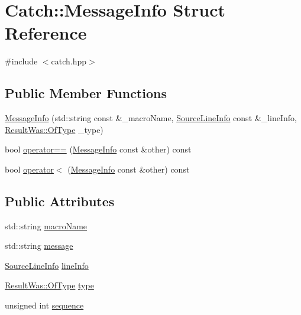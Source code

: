 \hypertarget{structCatch_1_1MessageInfo}{}\section{Catch\+:\+:Message\+Info Struct Reference}
\label{structCatch_1_1MessageInfo}


{\ttfamily \#include $<$catch.\+hpp$>$}

\subsection*{Public Member Functions}
\begin{DoxyCompactItemize}
\item 
\mbox{\hyperlink{structCatch_1_1MessageInfo_a2e336c33ebef7af3c1bbae6a56e14f8a}{Message\+Info}} (std\+::string const \&\+\_\+macro\+Name, \mbox{\hyperlink{structCatch_1_1SourceLineInfo}{Source\+Line\+Info}} const \&\+\_\+line\+Info, \mbox{\hyperlink{structCatch_1_1ResultWas_a624e1ee3661fcf6094ceef1f654601ef}{Result\+Was\+::\+Of\+Type}} \+\_\+type)
\item 
bool \mbox{\hyperlink{structCatch_1_1MessageInfo_af4b37f2172ba55395813b4bb6bbbde1a}{operator==}} (\mbox{\hyperlink{structCatch_1_1MessageInfo}{Message\+Info}} const \&other) const
\item 
bool \mbox{\hyperlink{structCatch_1_1MessageInfo_a8254cb8fca2da02a29a9843cdcb79df1}{operator$<$}} (\mbox{\hyperlink{structCatch_1_1MessageInfo}{Message\+Info}} const \&other) const
\end{DoxyCompactItemize}
\subsection*{Public Attributes}
\begin{DoxyCompactItemize}
\item 
std\+::string \mbox{\hyperlink{structCatch_1_1MessageInfo_a156ade4b3cc731f6ec7b542ae47ba8e3}{macro\+Name}}
\item 
std\+::string \mbox{\hyperlink{structCatch_1_1MessageInfo_ab6cd06e050bf426c6577502a5c50e256}{message}}
\item 
\mbox{\hyperlink{structCatch_1_1SourceLineInfo}{Source\+Line\+Info}} \mbox{\hyperlink{structCatch_1_1MessageInfo_a985165328723e599696ebd8e43195cc5}{line\+Info}}
\item 
\mbox{\hyperlink{structCatch_1_1ResultWas_a624e1ee3661fcf6094ceef1f654601ef}{Result\+Was\+::\+Of\+Type}} \mbox{\hyperlink{structCatch_1_1MessageInfo_ae928b9117465c696e45951d9d0284e78}{type}}
\item 
unsigned int \mbox{\hyperlink{structCatch_1_1MessageInfo_a7f4f57ea21e50160adefce7b68a781d6}{sequence}}
\end{DoxyCompactItemize}


